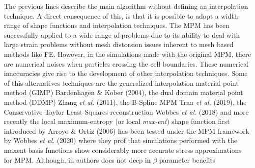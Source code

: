 The previous lines describe the main algorithm without defining an
interpolation technique. A direct consequence of this, is that it is
possible to adopt a width range of shape functions and interpolation techniques. The MPM has been
successfully applied to a wide range of problems due to its ability to
deal with large strain problems without mesh distorsion issues inherent to
mesh based methods like FE. However, in the simulations made with the
original MPM, there are numerical noises when particles crossing
the cell boundaries. These numerical inaccuracies give rise to the
development of other interpolation techniques. Some of this
alternatives techniques are the generalized interpolation material
point method (GIMP) Bardenhagen \& Kober (2004)\cite{Bardenhagen2004},
the dual domain material point method (DDMP) Zhang {\it et al.}
(2011)\cite{Zhang2011a}, the B-Spline MPM Tran {\it et al.}
(2019)\cite{Tran2019a}, the Conservative Taylor Least
Squares reconstruction Wobbes {\it et al.}
(2018)\cite{E_Wobbes_2018} and more recently the local
maximum-entropy (or local \textit{max-ent}) shape function first
introduced by Arroyo \& Ortiz (2006)\cite{Arroyo2006} has been tested
under the MPM framework by Wobbes {\it et al.}
(2020)\cite{Wobbes2020} where they prof that simulations performed with the maxent basis functions
show considerably more accurate stress approximations for
MPM. Although, in \cite{Wobbes2020} authors does not deep in $\beta$
parameter benefits

